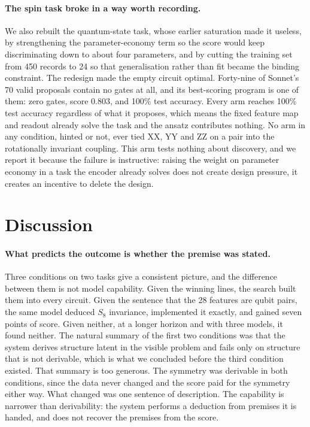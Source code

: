 \documentclass[11pt]{article}
\begin{document}
\paragraph{The spin task broke in a way worth recording.}
We also rebuilt the quantum-state task, whose earlier saturation made it useless,
by strengthening the parameter-economy term so the score would keep
discriminating down to about four parameters, and by cutting the training set
from 450 records to 24 so that generalisation rather than fit became the binding
constraint. The redesign made the empty circuit optimal. Forty-nine of Sonnet's
70 valid proposals contain no gates at all, and its best-scoring program is one
of them: zero gates, score 0.803, and 100\% test accuracy. Every arm reaches 100\%
test accuracy regardless of what it proposes, which means the fixed feature map
and readout already solve the task and the ansatz contributes nothing. No arm in
any condition, hinted or not, ever tied XX, YY and ZZ on a pair into the
rotationally invariant coupling. This arm tests nothing about discovery, and we
report it because the failure is instructive: raising the weight on parameter
economy in a task the encoder already solves does not create design pressure, it
creates an incentive to delete the design.

\section{Discussion}

\paragraph{What predicts the outcome is whether the premise was stated.}
Three conditions on two tasks give a consistent picture, and the difference
between them is not model capability. Given the winning lines, the search built
them into every circuit. Given the sentence that the 28 features are qubit pairs,
the same model deduced $S_8$ invariance, implemented it exactly, and gained seven
points of score. Given neither, at a longer horizon and with three models, it
found neither. The natural summary of the first two conditions was that the
system derives structure latent in the visible problem and fails only on
structure that is not derivable, which is what we concluded before the third
condition existed. That summary is too generous. The symmetry was derivable in
both conditions, since the data never changed and the score paid for the
symmetry either way. What changed was one sentence of description. The capability
is narrower than derivability: the system performs a deduction from premises it
is handed, and does not recover the premises from the score.
\end{document}
